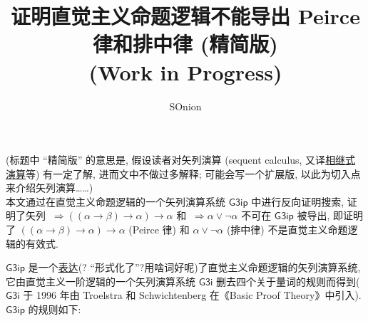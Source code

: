 \documentclass{article}
\title{证明直觉主义命题逻辑不能导出 Peirce 律和排中律 (精简版)\\(Work in Progress)}
\author{SOnion}
\def\To{\Rightarrow}
\def\a{\alpha}
\def\b{\beta}
\def\Gthreeip{$ \mathsf{G3ip}$ }
\def\Gthreei{$ \mathsf{G3i}$ }
\begin{document}
\maketitle




(标题中 ``精简版'' 的意思是, 假设读者对矢列演算 (sequent calculus, 又译\underline{相继式演算}等) 有一定了解, 进而文中不做过多解释; 可能会写一个扩展版, 以此为切入点来介绍矢列演算……)\\

本文通过在直觉主义命题逻辑的一个矢列演算系统 \Gthreeip 中进行反向证明搜索, 证明了矢列 $~\To((\a\to\b)\to\a)\to\a$ 和 $~\To \a\lor\neg\a$ 不可在 \Gthreeip 被导出, 即证明了 $((\a\to\b)\to\a)\to\a$ (Peirce 律) 和 $\a\lor\neg\a$ (排中律) 不是直觉主义命题逻辑的有效式. 

\Gthreeip 是一个\underline{表达}(? ``形式化了''?用啥词好呢)了直觉主义命题逻辑的矢列演算系统, 它由直觉主义一阶逻辑的一个矢列演算系统 \Gthreei 删去四个关于量词的规则而得到(\Gthreei 于 1996 年由 Troelstra 和 Schwichtenberg 在《Basic Proof Theory》中引入). \Gthreeip 的规则如下:
\end{document}

